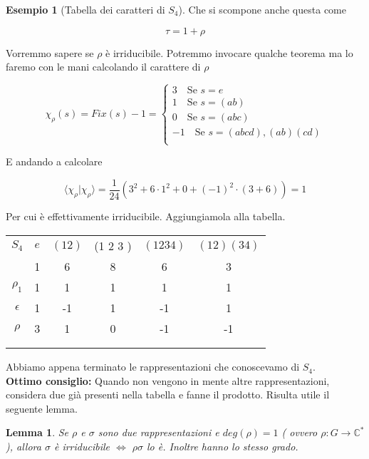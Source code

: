 \documentclass[11pt]{article}
\theoremstyle{plain}
\newtheorem{lemma}[thm]{Lemma}
\theoremstyle{definition}
\newtheorem{exmp}{Esempio}[section]
\theoremstyle{remark}
\begin{document}
\begin{exmp}[Tabella dei caratteri di $S_4$]
Che si scompone anche questa come

\[ \tau = 1 + \rho\]

Vorremmo sapere se $\rho$ è irriducibile. Potremmo invocare qualche teorema ma lo faremo con le mani calcolando il carattere di $\rho$


\[ \chi_\rho(s) = Fix(s) - 1 = 
\begin{cases}
3 \quad \text{Se } s = e \\
1 \quad \text{Se } s = (a b) \\
0 \quad \text{Se } s = (a b c) \\
-1 \quad \text{Se } s = (a b c d ), (a b) (c d)\\
\end{cases}
\]

E andando a calcolare

\[\langle\chi_\rho |\chi_\rho\rangle = \dfrac{1}{24}\left(3^2  + 6 \cdot 1^2  + 0 + (-1)^2 \cdot (3 +6 )\right) = 1\]
 

Per cui è effettivamente irriducibile.  Aggiungiamola alla tabella.


\begin{table}[!ht]
\centering
\begin{tabular}{|c|c|c|c|c|c|}
\hline
$S_4$  & $e$ & $(1 2)$ & (1 2 3 ) & $(1 2 3 4)$ & $(1 2)(3 4)$ \\
 & 1 & 6 & 8 & 6 & 3 \\
\hline
 $\rho_1$ & 1 & 1  & 1 & 1 & 1\\
\hline
$\epsilon$ & 1  & -1 & 1 & -1 & 1 \\
\hline
$\rho$& 3 & 1 & 0 & -1 & -1\\
\hline
& &  & & & \\
\hline
& &  & & & \\
\hline
\end{tabular}
\end{table}

Abbiamo appena terminato le rappresentazioni che conoscevamo di $S_4$.\\
\textbf{Ottimo consiglio:} Quando non vengono in mente altre rappresentazioni, considera due già presenti nella tabella e fanne il prodotto. Risulta utile il seguente lemma.

\begin{lemma}
Se $\rho$ e $\sigma$ sono due rappresentazioni e $deg(\rho)=1$ ( ovvero $\rho:G\rightarrow \mathbb{C}^*$), allora $\sigma$ è irriducibile $\Leftrightarrow$ $\rho\sigma$ lo è. Inoltre hanno lo stesso grado.
\end{lemma}


\end{exmp}
\end{document}
